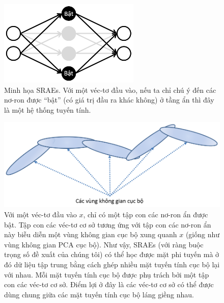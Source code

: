 \begin{figure}
	\centering
	\includegraphics[width=0.6\textwidth]{SRAE}
	\caption[Minh họa SRAEs]{Minh họa SRAEs. Với một véc-tơ đầu vào, nếu ta chỉ chú ý đến các nơ-ron được ``bật'' (có giá trị đầu ra khác không) ở tầng ẩn thì đây là một hệ thống tuyến tính.}
	\label{fig_SRAE}
\end{figure}
\begin{figure}
	\centering
	\includegraphics[width=\textwidth]{local_charts}
	\caption[Minh họa mặt phi tuyến mà SRAEs học được]{Với một véc-tơ đầu vào $x$, chỉ có một tập con các nơ-ron ẩn được bật. Tập con các véc-tơ cơ sở tương ứng với tập con các nơ-ron ẩn này biễu diễn một vùng không gian cục bộ xung quanh $x$ (giống như vùng không gian PCA cục bộ). Như vậy, SRAEs (với ràng buộc trọng số đề xuất của chúng tôi) có thể học được mặt phi tuyến mà ở đó dữ liệu tập trung bằng cách ghép nhiều mặt tuyến tính cục bộ lại với nhau. Mỗi mặt tuyến tính cục bộ được phụ trách bởi một tập con các véc-tơ cơ sở. Điểm lợi ở đây là các véc-tơ cơ sở có thể được dùng chung giữa các mặt tuyến tính cục bộ láng giềng nhau.}
	\label{fig_local_charts}
\end{figure}

